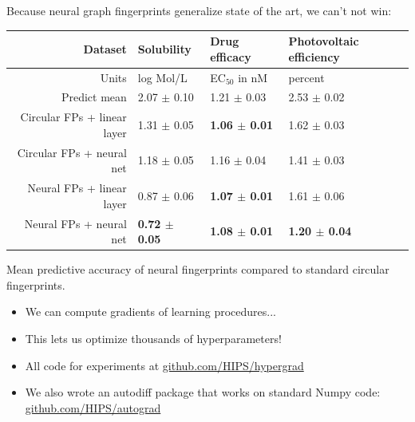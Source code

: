 \documentclass[landscape,a0b,final,a4resizeable]{include/a0poster}
\begin{document}
\begin{poster}
\begin{multicols}{3}
\vspace{0.5em}


Because neural graph fingerprints generalize state of the art, we can't not win:

\begin{center}
\begin{tabular}{r|lll}
Dataset                      &   Solubility  & Drug efficacy & Photovoltaic efficiency \\
\midrule
Units                        &   log Mol/L                            & EC$_{50}$ in nM                        & percent \\
\midrule
Predict mean                 & 2.07 $\pm$ 0.10        & 1.21 $\pm$ 0.03         & 2.53 $\pm$ 0.02 \\
Circular FPs + linear layer  & 1.31 $\pm$ 0.05        & \bf{1.06} $\pm$ 0.01    & 1.62 $\pm$ 0.03 \\
Circular FPs + neural net    & 1.18 $\pm$ 0.05        & 1.16 $\pm$ 0.04         & 1.41 $\pm$ 0.03 \\ 
Neural FPs + linear layer    & 0.87 $\pm$ 0.06        & \bf{1.07} $\pm$ 0.01    & 1.61 $\pm$ 0.06 \\  
Neural FPs + neural net      & \bf{0.72} $\pm$ 0.05   & \bf{1.08} $\pm$ 0.01    & \bf{1.20} $\pm$ 0.04
\end{tabular}

Mean predictive accuracy of neural fingerprints compared to standard circular fingerprints.
\end{center}


\vspace{0.5em}


\begin{itemize}
\item We can compute gradients of learning procedures...
\item This lets us optimize thousands of hyperparameters!
\item All code for experiments at \url{github.com/HIPS/hypergrad}
\item We also wrote an autodiff package that works on standard Numpy code:\\ \url{github.com/HIPS/autograd}
\end{itemize}



\end{multicols}
\end{poster}
\end{document}
